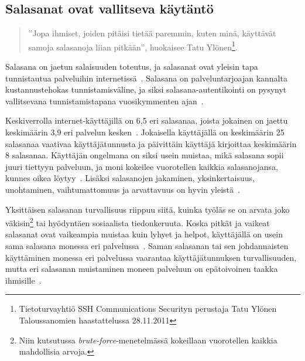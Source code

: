 \documentclass[finnish,gradu]{tktltiki}
\begin{document}
  \subsection{Salasanat ovat vallitseva käytäntö} %
  \label{sub:salasanat}

  \begin{quote}
    ''Jopa ihmiset, joiden pitäisi tietää paremmin, kuten minä, käyttävät samoja salasanoja liian pitkään'', huokaisee Tatu Ylönen\footnote{Tietoturvayhtiö SSH Communications Securityn perustaja Tatu Ylönen Taloussanomien haastattelussa 28.11.2011}.
  \end{quote}

  Salasana on jaetun salaisuuden toteutus, ja salasanat ovat yleisin tapa tunnistautua palveluihin internetissä~\cite{study_of_passwords_07, passpet_06, password_management_strategies_06, pwdhash_extension_05}. Salasana on palveluntarjoajan kannalta kustannustehokas tunnistamisväline, ja siksi salasana-autentikointi on pysynyt vallitsevana tunnistamistapana vuosikymmenten ajan~\cite{pw_auth_system_perspective_08}.

  Keskiverrolla internet-käyttäjillä on 6,5 eri salasanaa, joista jokainen on jaettu keskimäärin 3,9 eri palvelun kesken~\cite{study_of_passwords_07}. Jokaisella käyttäjällä on keskimäärin 25 salasanaa vaativaa käyttäjätunnusta ja päivittäin käyttäjä kirjoittaa keskimäärin 8 salasanaa. Käyttäjän ongelmana on siksi usein muistaa, mikä salasana sopii juuri tiettyyn palveluun, ja moni kokeilee vuorotellen kaikkia salasanojansa, kunnes oikea löytyy~\cite{study_of_passwords_07}. Lisäksi salasanojen jakaminen, yksinkertaisuus, unohtaminen, vaihtumattomuus ja arvattavuus on hyvin yleistä~\cite{password_management_strategies_06, pw_auth_system_perspective_08, passpet_06}.

  Yksittäisen salasanan turvallisuus riippuu siitä, kuinka työläs se on arvata joko väkisin\footnote{Niin kutsutussa \emph{brute-force}-menetelmässä kokeillaan vuorotellen kaikkia mahdollisia arvoja.} tai hyödyntäen sosiaalista tiedonkeruuta. Koska pitkät ja vaikeat salasanat ovat vaikeampia muistaa kuin lyhyet ja helpot, käyttäjällä on usein sama salasana monessa eri palvelussa~\cite{study_of_passwords_07}. Saman salasanan tai sen johdannaisten käyttäminen monessa eri palvelussa vaarantaa käyttäjätunnuksen turvallisuuden, mutta eri salasanan muistaminen moneen palveluun on epätoivoinen taakka ihmisille~\cite{password_management_strategies_06, passpet_06, pw_auth_system_perspective_08, users_are_not_the_enemy_99}.
\end{document}
